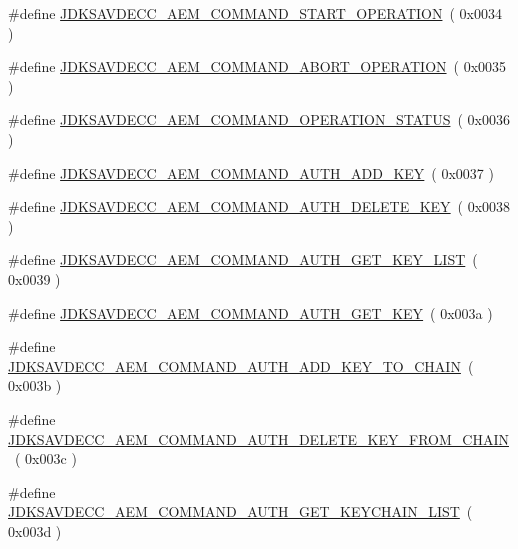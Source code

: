 \begin{DoxyCompactItemize}
\#define \hyperlink{group__command_ga6d1838e518b989e48a5cc727401fb4db}{J\+D\+K\+S\+A\+V\+D\+E\+C\+C\+\_\+\+A\+E\+M\+\_\+\+C\+O\+M\+M\+A\+N\+D\+\_\+\+S\+T\+A\+R\+T\+\_\+\+O\+P\+E\+R\+A\+T\+I\+ON}~( 0x0034 )
\item 
\#define \hyperlink{group__command_ga9ac9b4714b2f11976edeee84eff5dc80}{J\+D\+K\+S\+A\+V\+D\+E\+C\+C\+\_\+\+A\+E\+M\+\_\+\+C\+O\+M\+M\+A\+N\+D\+\_\+\+A\+B\+O\+R\+T\+\_\+\+O\+P\+E\+R\+A\+T\+I\+ON}~( 0x0035 )
\item 
\#define \hyperlink{group__command_ga1c534ca8545181b69fbda194a579b022}{J\+D\+K\+S\+A\+V\+D\+E\+C\+C\+\_\+\+A\+E\+M\+\_\+\+C\+O\+M\+M\+A\+N\+D\+\_\+\+O\+P\+E\+R\+A\+T\+I\+O\+N\+\_\+\+S\+T\+A\+T\+US}~( 0x0036 )
\item 
\#define \hyperlink{group__command_ga0062c38506017f1353fd09f3035d77b8}{J\+D\+K\+S\+A\+V\+D\+E\+C\+C\+\_\+\+A\+E\+M\+\_\+\+C\+O\+M\+M\+A\+N\+D\+\_\+\+A\+U\+T\+H\+\_\+\+A\+D\+D\+\_\+\+K\+EY}~( 0x0037 )
\item 
\#define \hyperlink{group__command_ga3a73712b3e443fe28a16a29d41ea3f9c}{J\+D\+K\+S\+A\+V\+D\+E\+C\+C\+\_\+\+A\+E\+M\+\_\+\+C\+O\+M\+M\+A\+N\+D\+\_\+\+A\+U\+T\+H\+\_\+\+D\+E\+L\+E\+T\+E\+\_\+\+K\+EY}~( 0x0038 )
\item 
\#define \hyperlink{group__command_ga40969931db1cae6a4ffced7a5f9cdd8b}{J\+D\+K\+S\+A\+V\+D\+E\+C\+C\+\_\+\+A\+E\+M\+\_\+\+C\+O\+M\+M\+A\+N\+D\+\_\+\+A\+U\+T\+H\+\_\+\+G\+E\+T\+\_\+\+K\+E\+Y\+\_\+\+L\+I\+ST}~( 0x0039 )
\item 
\#define \hyperlink{group__command_ga394dff8599150e300e83fc6c4b702382}{J\+D\+K\+S\+A\+V\+D\+E\+C\+C\+\_\+\+A\+E\+M\+\_\+\+C\+O\+M\+M\+A\+N\+D\+\_\+\+A\+U\+T\+H\+\_\+\+G\+E\+T\+\_\+\+K\+EY}~( 0x003a )
\item 
\#define \hyperlink{group__command_ga7a808964d0fe0ce55229fa7001d82f61}{J\+D\+K\+S\+A\+V\+D\+E\+C\+C\+\_\+\+A\+E\+M\+\_\+\+C\+O\+M\+M\+A\+N\+D\+\_\+\+A\+U\+T\+H\+\_\+\+A\+D\+D\+\_\+\+K\+E\+Y\+\_\+\+T\+O\+\_\+\+C\+H\+A\+IN}~( 0x003b )
\item 
\#define \hyperlink{group__command_ga0ba84d5c3a146d6a85e64eb2f47fb390}{J\+D\+K\+S\+A\+V\+D\+E\+C\+C\+\_\+\+A\+E\+M\+\_\+\+C\+O\+M\+M\+A\+N\+D\+\_\+\+A\+U\+T\+H\+\_\+\+D\+E\+L\+E\+T\+E\+\_\+\+K\+E\+Y\+\_\+\+F\+R\+O\+M\+\_\+\+C\+H\+A\+IN}~( 0x003c )
\item 
\#define \hyperlink{group__command_gac8b47539de8e8b07d3a2417c718d70ef}{J\+D\+K\+S\+A\+V\+D\+E\+C\+C\+\_\+\+A\+E\+M\+\_\+\+C\+O\+M\+M\+A\+N\+D\+\_\+\+A\+U\+T\+H\+\_\+\+G\+E\+T\+\_\+\+K\+E\+Y\+C\+H\+A\+I\+N\+\_\+\+L\+I\+ST}~( 0x003d )
\item 

\end{DoxyCompactItemize}
